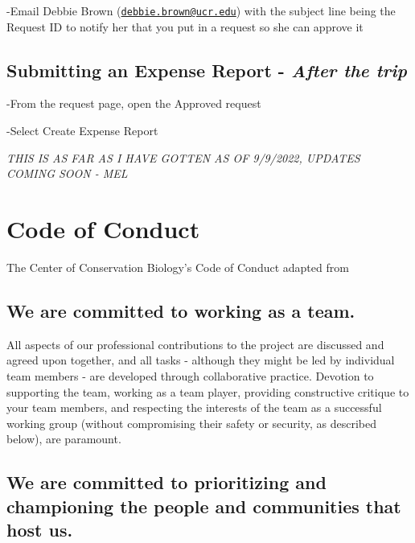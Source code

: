 \documentclass[
]{book}
\begin{document}
-Email Debbie Brown (\href{mailto:debbie.brown@ucr.edu}{\nolinkurl{debbie.brown@ucr.edu}}) with the subject line being the Request ID to notify her that you put in a request so she can approve it

\hypertarget{submitting-an-expense-report---after-the-trip}{%
\section{\texorpdfstring{Submitting an Expense Report - \emph{After the trip}}{Submitting an Expense Report - After the trip}}\label{submitting-an-expense-report---after-the-trip}}

-From the request page, open the Approved request

-Select Create Expense Report

\emph{THIS IS AS FAR AS I HAVE GOTTEN AS OF 9/9/2022, UPDATES COMING SOON - MEL}

\hypertarget{codeofconduct}{%
\chapter{Code of Conduct}\label{codeofconduct}}

The Center of Conservation Biology's Code of Conduct adapted from \citep{Perry_2018}

\hypertarget{we-are-committed-to-working-as-a-team.}{%
\section{We are committed to working as a team.}\label{we-are-committed-to-working-as-a-team.}}

All aspects of our professional contributions to the project are discussed and agreed upon together, and all tasks - although they might be led by individual team members - are developed through collaborative practice. Devotion to supporting the team, working as a team player, providing constructive critique to your team members, and respecting the interests of the team as a successful working group (without compromising their safety or security, as described below), are paramount.

\hypertarget{we-are-committed-to-prioritizing-and-championing-the-people-and-communities-that-host-us.}{%
\section{We are committed to prioritizing and championing the people and communities that host us.}\label{we-are-committed-to-prioritizing-and-championing-the-people-and-communities-that-host-us.}}
\end{document}
